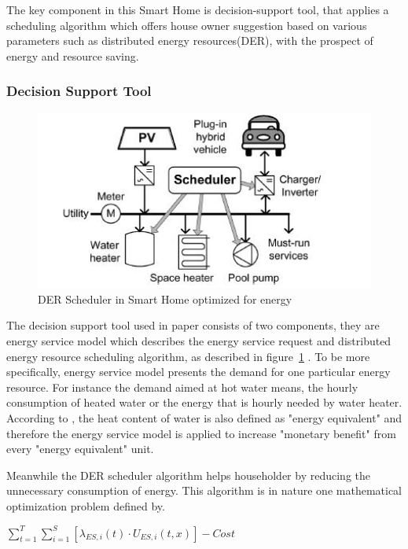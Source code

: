 The key component in this Smart Home is decision-support tool\cite{smart_home_for_energy}, that applies a scheduling algorithm which offers house owner suggestion based on various parameters such as distributed energy resources(DER), with the prospect of energy and resource saving.

\subsubsection{Decision Support Tool}

 \begin{figure}[!htbp]
	\centering
	\includegraphics[width=1.0\textwidth]{scheduler.jpg}
		\caption{DER Scheduler in Smart Home optimized for energy\cite{smart_home_for_energy}}
	\label{fig:smart-home-scheduler}
\end{figure}

The decision support tool used in paper\cite{smart_home_for_energy} consists of two components, they are energy service model which describes the energy service request and distributed energy resource scheduling algorithm, as described in figure~\ref{fig:smart-home-scheduler} . To be more specifically, energy service model presents  the demand for one particular energy resource. For instance the demand aimed at hot water means, the hourly consumption of heated water or the energy that is hourly needed by water heater.  According to \cite{smart_home_for_energy}, the heat content of water is also defined as "energy equivalent" and therefore the energy service model is applied to increase "monetary benefit"  from every "energy equivalent" unit.

Meanwhile the DER scheduler algorithm helps householder by reducing the unnecessary consumption of energy. This algorithm is in nature one mathematical optimization problem defined by\cite{smart_home_for_energy}.
\begin{center}
 $ \sum_{t=1}^{T}\sum_{i=1}^{S}[\lambda_{ES,i}(t)\cdot {U_{ES,i}}(t,x)]-Cost$
\end{center}

